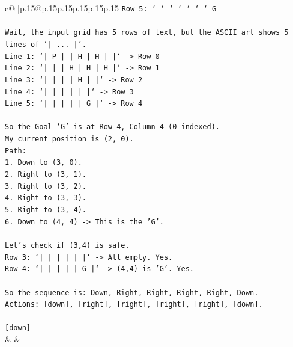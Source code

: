 \documentclass{article}
\begin{document}
{\begin{supertabular}{c@{$\;$}|p{.15\linewidth}@{}p{.15\linewidth}p{.15\linewidth}p{.15\linewidth}p{.15\linewidth}p{.15\linewidth}}
{{{\texttt{Row 5: ` ` ` ` ` ` ` G} \\
\\ 
\texttt{Wait, the input grid has 5 rows of text, but the ASCII art shows 5 lines of `| ... |`.} \\
\texttt{Line 1: `| P  |     |  H  |  H  |     |` {-}> Row 0} \\
\texttt{Line 2: `|     |     |  H  |  H  |  H  |` {-}> Row 1} \\
\texttt{Line 3: `|     |     |     |  H  |     |` {-}> Row 2} \\
\texttt{Line 4: `|     |     |     |     |     |` {-}> Row 3} \\
\texttt{Line 5: `|     |     |     |     |  G  |` {-}> Row 4} \\
\\ 
\texttt{So the Goal 'G' is at Row 4, Column 4 (0{-}indexed).} \\
\texttt{My current position is (2, 0).} \\
\texttt{Path:} \\
\texttt{1. Down to (3, 0).} \\
\texttt{2. Right to (3, 1).} \\
\texttt{3. Right to (3, 2).} \\
\texttt{4. Right to (3, 3).} \\
\texttt{5. Right to (3, 4).} \\
\texttt{6. Down to (4, 4) {-}> This is the 'G'.} \\
\\ 
\texttt{Let's check if (3,4) is safe.} \\
\texttt{Row 3: `|     |     |     |     |     |` {-}> All empty. Yes.} \\
\texttt{Row 4: `|     |     |     |     |  G  |` {-}> (4,4) is 'G'. Yes.} \\
\\ 
\texttt{So the sequence is: Down, Right, Right, Right, Right, Down.} \\
\texttt{Actions: {[}down{]}, {[}right{]}, {[}right{]}, {[}right{]}, {[}right{]}, {[}down{]}.} \\
\\ 
\texttt{{[}down{]}} \\
            }
        }
    }
    & & \\ \\


\end{supertabular}}
\end{document}
